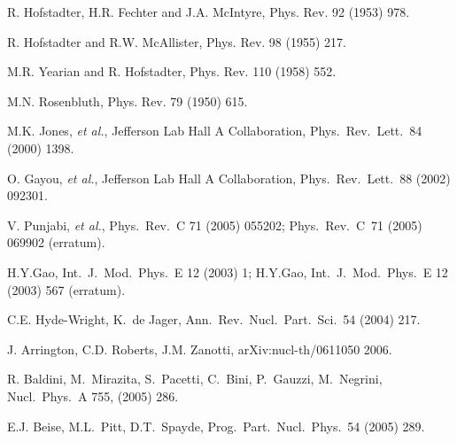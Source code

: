 \begin{thebibliography}{PPV06}

R. Hofstadter, H.R. Fechter and J.A. McIntyre,
Phys. Rev.  92 (1953) 978.

R. Hofstadter and R.W. McAllister, Phys. Rev. 98 (1955) 217.

M.R. Yearian and R. Hofstadter, Phys. Rev. 110 (1958) 552.

M.N. Rosenbluth, Phys. Rev.  79 (1950) 615.

M.K. Jones, {\it et al.}, Jefferson Lab Hall A Collaboration,
Phys.\ Rev.\ Lett.\ 84 (2000) 1398.

O. Gayou, {\it et al.}, Jefferson Lab Hall A Collaboration,
Phys.\ Rev.\ Lett.\ 88 (2002) 092301.

V. Punjabi, {\it et al.},
  Phys.\ Rev.\ C  71 (2005) 055202;
  Phys.\ Rev.\ C\ 71 (2005)  069902 (erratum).

  H.Y.Gao,
  Int.\ J.\ Mod.\ Phys.\ E 12 (2003) 1;
  H.Y.Gao, Int.\ J.\ Mod.\ Phys.\ E 12 (2003) 567 (erratum).

  C.E. Hyde-Wright, K.~de Jager,
  Ann.\ Rev.\ Nucl.\ Part.\ Sci.\  54 (2004) 217.

J. Arrington, C.D. Roberts, J.M. Zanotti, arXiv:nucl-th/0611050 2006.

R. Baldini, M.~Mirazita, S.~Pacetti, C.~Bini, P.~Gauzzi, M.~Negrini,
  Nucl.\ Phys.\  A 755, (2005) 286.

  E.J. Beise, M.L.~Pitt, D.T.~Spayde,
  Prog.\ Part.\ Nucl.\ Phys.\  54 (2005) 289.


\end{thebibliography}
